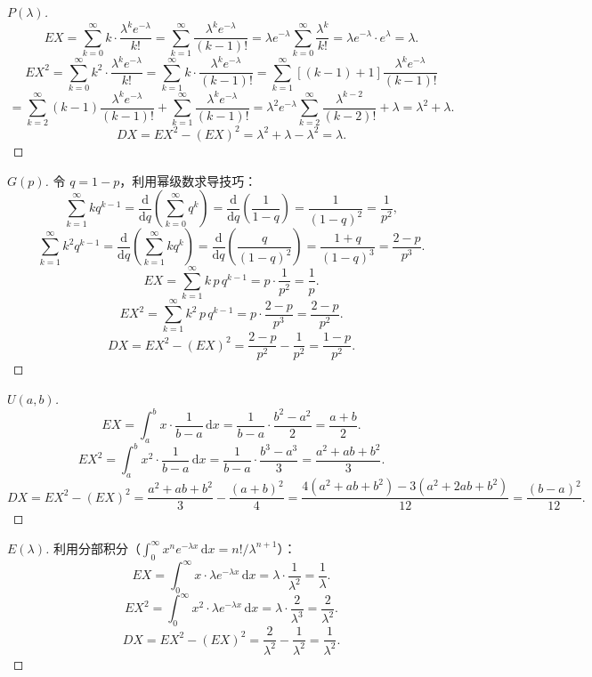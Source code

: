 ﻿\documentclass[lang=cn,11pt]{elegantbook}
\begin{document}
\begin{proof}[\(P(\lambda)\)]
\[EX = \sum_{k=0}^{\infty}k\cdot\frac{\lambda^k e^{-\lambda}}{k!} = \sum_{k=1}^{\infty}\frac{\lambda^k e^{-\lambda}}{(k-1)!} = \lambda e^{-\lambda}\sum_{k=0}^{\infty}\frac{\lambda^k}{k!} = \lambda e^{-\lambda}\cdot e^{\lambda} = \lambda.\]
\[EX^2 = \sum_{k=0}^{\infty}k^2\cdot\frac{\lambda^k e^{-\lambda}}{k!} = \sum_{k=1}^{\infty}k\cdot\frac{\lambda^k e^{-\lambda}}{(k-1)!} = \sum_{k=1}^{\infty}[(k-1)+1]\frac{\lambda^k e^{-\lambda}}{(k-1)!}\]
\[= \sum_{k=2}^{\infty}(k-1)\frac{\lambda^k e^{-\lambda}}{(k-1)!} + \sum_{k=1}^{\infty}\frac{\lambda^k e^{-\lambda}}{(k-1)!} = \lambda^2 e^{-\lambda}\sum_{k=2}^{\infty}\frac{\lambda^{k-2}}{(k-2)!} + \lambda = \lambda^2 + \lambda.\]
\[DX = EX^2 - (EX)^2 = \lambda^2 + \lambda - \lambda^2 = \lambda.\]
\end{proof}

\begin{proof}[\(G(p)\)]
令 \(q=1-p\)，利用幂级数求导技巧：
\[\sum_{k=1}^{\infty}kq^{k-1} = \frac{\mathrm{d}}{\mathrm{d}q}\!\left(\sum_{k=0}^{\infty}q^k\right) = \frac{\mathrm{d}}{\mathrm{d}q}\!\left(\frac{1}{1-q}\right) = \frac{1}{(1-q)^2} = \frac{1}{p^2},
\]
\[
\sum_{k=1}^{\infty}k^2 q^{k-1} = \frac{\mathrm{d}}{\mathrm{d}q}\!\left(\sum_{k=1}^{\infty}kq^k\right) = \frac{\mathrm{d}}{\mathrm{d}q}\!\left(\frac{q}{(1-q)^2}\right) = \frac{1+q}{(1-q)^3} = \frac{2-p}{p^3}.
\]
\[
EX = \sum_{k=1}^{\infty}k\,p\,q^{k-1} = p\cdot\frac{1}{p^2} = \frac{1}{p}.
\]
\[
EX^2 = \sum_{k=1}^{\infty}k^2\,p\,q^{k-1} = p\cdot\frac{2-p}{p^3} = \frac{2-p}{p^2}.
\]
\[
DX = EX^2 - (EX)^2 = \frac{2-p}{p^2} - \frac{1}{p^2} = \frac{1-p}{p^2}.
\]
\end{proof}

\begin{proof}[\(U(a,b)\)]
\[
EX = \int_a^b x\cdot\frac{1}{b-a}\,\mathrm{d}x = \frac{1}{b-a}\cdot\frac{b^2-a^2}{2} = \frac{a+b}{2}.
\]
\[
EX^2 = \int_a^b x^2\cdot\frac{1}{b-a}\,\mathrm{d}x = \frac{1}{b-a}\cdot\frac{b^3-a^3}{3} = \frac{a^2+ab+b^2}{3}.
\]
\[
DX = EX^2 - (EX)^2 = \frac{a^2+ab+b^2}{3} - \frac{(a+b)^2}{4} = \frac{4(a^2+ab+b^2)-3(a^2+2ab+b^2)}{12} = \frac{(b-a)^2}{12}.
\]
\end{proof}

\begin{proof}[\(E(\lambda)\)]
利用分部积分（\(\int_0^\infty x^n e^{-\lambda x}\,\mathrm{d}x = n!/\lambda^{n+1}\)）：
\[
EX = \int_0^\infty x\cdot\lambda e^{-\lambda x}\,\mathrm{d}x = \lambda\cdot\frac{1}{\lambda^2} = \frac{1}{\lambda}.
\]
\[
EX^2 = \int_0^\infty x^2\cdot\lambda e^{-\lambda x}\,\mathrm{d}x = \lambda\cdot\frac{2}{\lambda^3} = \frac{2}{\lambda^2}.
\]
\[
DX = EX^2 - (EX)^2 = \frac{2}{\lambda^2} - \frac{1}{\lambda^2} = \frac{1}{\lambda^2}.
\]
\end{proof}
\end{document}
